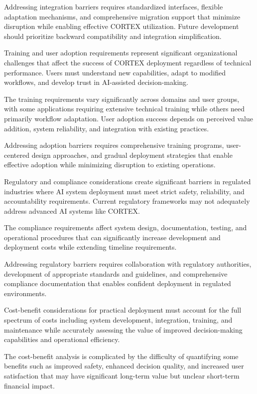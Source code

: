 Addressing integration barriers requires standardized interfaces, flexible adaptation mechanisms, and comprehensive migration support that minimize disruption while enabling effective CORTEX utilization. Future development should prioritize backward compatibility and integration simplification.

Training and user adoption requirements represent significant organizational challenges that affect the success of CORTEX deployment regardless of technical performance. Users must understand new capabilities, adapt to modified workflows, and develop trust in AI-assisted decision-making.

The training requirements vary significantly across domains and user groups, with some applications requiring extensive technical training while others need primarily workflow adaptation. User adoption success depends on perceived value addition, system reliability, and integration with existing practices.

Addressing adoption barriers requires comprehensive training programs, user-centered design approaches, and gradual deployment strategies that enable effective adoption while minimizing disruption to existing operations.

Regulatory and compliance considerations create significant barriers in regulated industries where AI system deployment must meet strict safety, reliability, and accountability requirements. Current regulatory frameworks may not adequately address advanced AI systems like CORTEX.

The compliance requirements affect system design, documentation, testing, and operational procedures that can significantly increase development and deployment costs while extending timeline requirements.

Addressing regulatory barriers requires collaboration with regulatory authorities, development of appropriate standards and guidelines, and comprehensive compliance documentation that enables confident deployment in regulated environments.

Cost-benefit considerations for practical deployment must account for the full spectrum of costs including system development, integration, training, and maintenance while accurately assessing the value of improved decision-making capabilities and operational efficiency.

The cost-benefit analysis is complicated by the difficulty of quantifying some benefits such as improved safety, enhanced decision quality, and increased user satisfaction that may have significant long-term value but unclear short-term financial impact.

